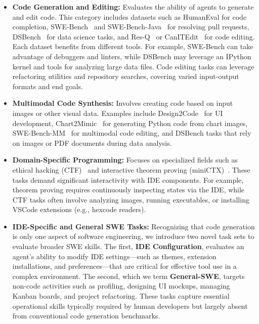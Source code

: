 \begin{itemize}[leftmargin=*]
    \item \textbf{Code Generation and Editing:} Evaluates the ability of agents to generate and edit code. This category includes datasets such as HumanEval for code completion, SWE-Bench~\cite{Jimenez2023SWEbenchCL} and SWE-Bench-Java~\cite{zan2024swebenchjavagithubissueresolving} for resolving pull requests, DSBench~\cite{jing2024dsbench} for data science tasks, and Res-Q~\cite{labash2024resqevaluatingcodeeditinglarge} or CanITEdit~\cite{cassano2024editevaluatingabilitylarge} for code editing. Each dataset benefits from different tools. For example, SWE-Bench can take advantage of debuggers and linters, while DSBench may leverage an IPython kernel and tools for analyzing large data files. Code editing tasks can leverage refactoring utilities and repository searches, covering varied input-output formats and end goals.

    \item \textbf{Multimodal Code Synthesis:} Involves creating code based on input images or other visual data. Examples include Design2Code~\cite{Si2024Design2CodeHF} for UI development, Chart2Mimic~\cite{Shi2024ChartMimicEL} for generating Python code from chart images, SWE-Bench-MM~\cite{yang2024swebenchmultimodalaisystems} for multimodal code editing, and DSBench tasks that rely on images or PDF documents during data analysis.

    \item \textbf{Domain-Specific Programming:} Focuses on specialized fields such as ethical hacking (CTF)~\cite{yang2023intercodestandardizingbenchmarkinginteractive} and interactive theorem proving (miniCTX)~\cite{hu2024minictxneuraltheoremproving}. These tasks demand significant interactivity with IDE components. For example, theorem proving requires continuously inspecting states via the IDE, while CTF tasks often involve analyzing images, running executables, or installing VSCode extensions (e.g., hexcode readers).

    \item \textbf{IDE-Specific and General SWE Tasks:} Recognizing that code generation is only one aspect of software engineering, we introduce two novel task sets to evaluate broader SWE skills. The first, \textbf{IDE Configuration}, evaluates an agent's ability to modify IDE settings—such as themes, extension installations, and preferences—that are critical for effective tool use in a complex environment. The second, which we term \textbf{General-SWE}, targets non-code activities such as profiling, designing UI mockups, managing Kanban boards, and project refactoring. These tasks capture essential operational skills typically required by human developers but largely absent from conventional code generation benchmarks.

\end{itemize}

